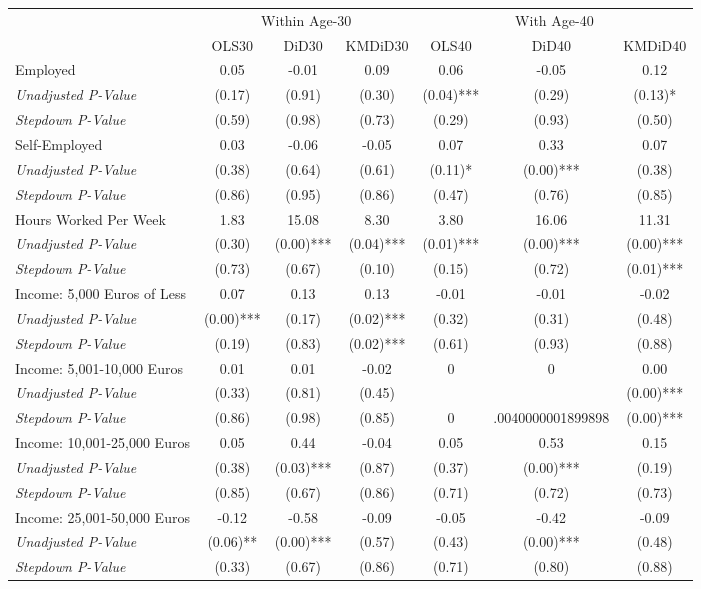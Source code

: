 \begin{tabular}{l c c c c c c}
\toprule
& \multicolumn{3}{c}{Within Age-30} & \multicolumn{3}{c}{With Age-40} \\\cmidrule(lr){2-4} \cmidrule(lr){5-7}
 & OLS30 & DiD30 & KMDiD30 & OLS40 & DiD40 & KMDiD40 \\
\midrule
Employed & 0.05 & -0.01 & 0.09 & 0.06 & -0.05 & 0.12 \\
\quad \textit{Unadjusted P-Value} & (0.17) & (0.91) & (0.30) & (0.04)*** & (0.29) & (0.13)* \\
\quad \textit{Stepdown P-Value} & (0.59) & (0.98) & (0.73) & (0.29) & (0.93) & (0.50) \\
Self-Employed & 0.03 & -0.06 & -0.05 & 0.07 & 0.33 & 0.07 \\
\quad \textit{Unadjusted P-Value} & (0.38) & (0.64) & (0.61) & (0.11)* & (0.00)*** & (0.38) \\
\quad \textit{Stepdown P-Value} & (0.86) & (0.95) & (0.86) & (0.47) & (0.76) & (0.85) \\
Hours Worked Per Week & 1.83 & 15.08 & 8.30 & 3.80 & 16.06 & 11.31 \\
\quad \textit{Unadjusted P-Value} & (0.30) & (0.00)*** & (0.04)*** & (0.01)*** & (0.00)*** & (0.00)*** \\
\quad \textit{Stepdown P-Value} & (0.73) & (0.67) & (0.10) & (0.15) & (0.72) & (0.01)*** \\
Income: 5,000 Euros of Less & 0.07 & 0.13 & 0.13 & -0.01 & -0.01 & -0.02 \\
\quad \textit{Unadjusted P-Value} & (0.00)*** & (0.17) & (0.02)*** & (0.32) & (0.31) & (0.48) \\
\quad \textit{Stepdown P-Value} & (0.19) & (0.83) & (0.02)*** & (0.61) & (0.93) & (0.88) \\
Income: 5,001-10,000 Euros & 0.01 & 0.01 & -0.02 & 0 & 0 & 0.00 \\
\quad \textit{Unadjusted P-Value} & (0.33) & (0.81) & (0.45) & & & (0.00)*** \\
\quad \textit{Stepdown P-Value} & (0.86) & (0.98) & (0.85) & 0 & .0040000001899898 & (0.00)*** \\
Income: 10,001-25,000 Euros & 0.05 & 0.44 & -0.04 & 0.05 & 0.53 & 0.15 \\
\quad \textit{Unadjusted P-Value} & (0.38) & (0.03)*** & (0.87) & (0.37) & (0.00)*** & (0.19) \\
\quad \textit{Stepdown P-Value} & (0.85) & (0.67) & (0.86) & (0.71) & (0.72) & (0.73) \\
Income: 25,001-50,000 Euros & -0.12 & -0.58 & -0.09 & -0.05 & -0.42 & -0.09 \\
\quad \textit{Unadjusted P-Value} & (0.06)** & (0.00)*** & (0.57) & (0.43) & (0.00)*** & (0.48) \\
\quad \textit{Stepdown P-Value} & (0.33) & (0.67) & (0.86) & (0.71) & (0.80) & (0.88) \\
\bottomrule
\end{tabular}
